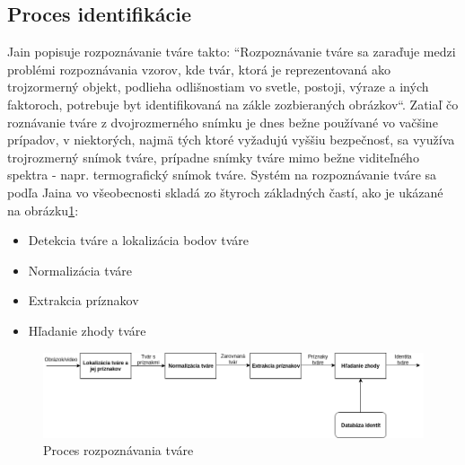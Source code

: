 \subsection{Proces identifikácie}
Jain popisuje rozpoznávanie tváre takto: ``Rozpoznávanie tváre sa zaraďuje medzi problémi rozpoznávania vzorov, kde tvár, ktorá je reprezentovaná ako trojzormerný objekt,
podlieha odlišnostiam vo svetle, postoji, výraze a iných faktoroch, potrebuje byt identifikovaná na zákle zozbieraných obrázkov``\cite{handbookface}.
Zatiaľ čo roznávanie tváre z dvojrozmerného snímku je dnes bežne používané vo vačšine prípadov, v niektorých, najmä tých ktoré vyžadujú vyššiu bezpečnosť,
sa využíva trojrozmerný snímok tváre,
prípadne snímky tváre mimo bežne viditeľného spektra - napr. termografický snímok tváre.  Systém na rozpoznávanie tváre sa podľa Jaina\cite{handbookface} vo všeobecnosti skladá zo štyroch
základných častí, ako je ukázané na obrázku\ref{fig:workflow}:

\begin{itemize}
	\item Detekcia tváre a lokalizácia bodov tváre
	\item Normalizácia tváre
	\item Extrakcia príznakov
	\item Hľadanie zhody tváre
\end{itemize}

\begin{figure}[H]
	\centering
	\includegraphics[width=1\linewidth]{img/workflow}
	\caption{Proces rozpoznávania tváre}
	\label{fig:workflow}
\end{figure}

